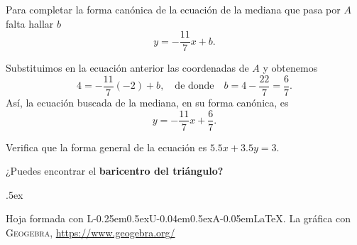 \documentclass[12pt,letterpaper]{article}
\newcommand{\LuaLaTeX}{L\kern-0.25em\raise0.5ex\hbox{\tiny U}\kern-0.04em\raise0.5ex\hbox{\tiny A}\kern-0.05em\LaTeX}
\newcommand{\fej}{\relax\hfill\ifmmode{\lower.5ex\hbox{{\textcolor{blue}{\LARGE\smiley al 15pt}}}}\else\lower.5ex\hbox{{\textcolor{blue}{\LARGE \smiley}}}}  %
\begin{document}
Para completar la forma canónica de la ecuación de la mediana que pasa por $A$ falta hallar $b$
$$y=-\dfrac{11}{7}x+b.$$

Substituimos en la ecuación anterior las coordenadas de $A$ y obtenemos
$$4=-\dfrac{11}{7}(-2)+b,\quad\text{de donde}\quad b=4-\frac{22}{7}=\frac{6}{7}.$$
Así, la ecuación buscada de la mediana, en su forma canónica, es
$$y=-\dfrac{11}{7}x+\frac{6}{7}.$$

Verifica que la forma general de la ecuación es $5{.}5x+3{.}5y=3$.

¿Puedes encontrar el \textbf{\color{purple}baricentro del triángulo?}





\fej
\vfill 

\begin{center}
	{\footnotesize\color{olive} Hoja formada con \LuaLaTeX. La gráfica con \textsc{Geogebra}, \url{https://www.geogebra.org/}}
\end{center}
\end{document}
